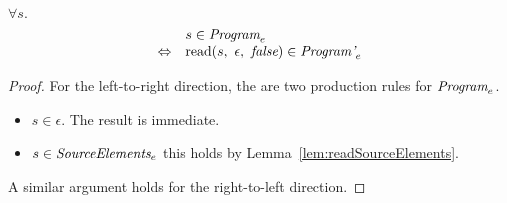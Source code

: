 \documentclass[preprint,10pt]{sigplanconf}
\begin{document}

\begin{theorem}\mbox{}

  \( \forall s. \)
  \[
  \begin{array}{rl}
  &s \in \textit{Program}_{e} \\
  \Leftrightarrow&
  \textrm{read}(s,~\epsilon,~\textit{false}) \in \textit{Program'}_{e}
  \end{array}
  \]
\end{theorem}
\begin{proof}

  For the left-to-right direction, the are two production rules for 
  \( \textit{Program}_{e} \).
  \begin{itemize}
  \item \( s \in \epsilon \). The result is immediate.

  \item \( s \in \textit{SourceElements}_{e} \)
    this holds by Lemma~\ref{lem:readSourceElements}.
  \end{itemize}

  A similar argument holds for the right-to-left direction.
\end{proof}
\end{document}
